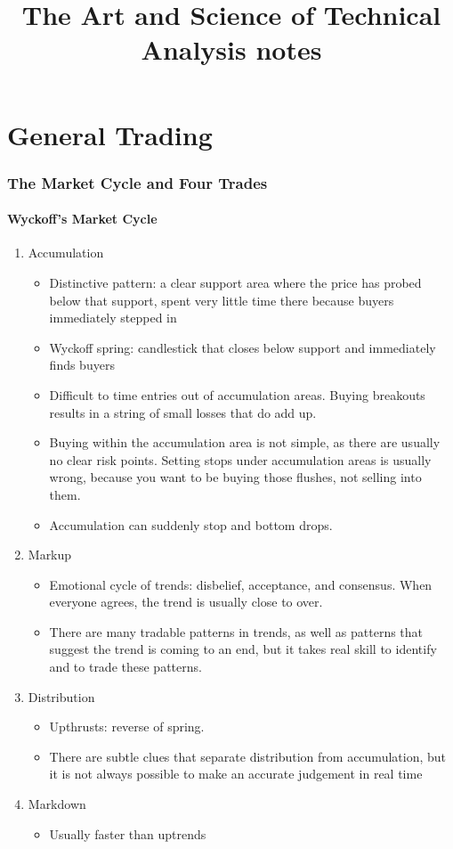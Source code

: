 \documentclass{../notes}
\title{The Art and Science of Technical Analysis notes}
\begin{document}
\maketitle

\part{General Trading}
\section{The Market Cycle and Four Trades}
\subsection{Wyckoff's Market Cycle}
\begin{enumerate}
  \item Accumulation
  \begin{itemize}
    \item Distinctive pattern: a clear support area where the price has probed below that support, spent very little time there because buyers immediately stepped in
    \item Wyckoff spring: candlestick that closes below support and immediately finds buyers
    \item Difficult to time entries out of accumulation areas. Buying breakouts results in a string of small losses that do add up.
    \item Buying within the accumulation area is not simple, as there are usually no clear risk points. Setting stops under accumulation areas is usually wrong, because you want to be buying those flushes, not selling into them.
    \item Accumulation can suddenly stop and bottom drops.
  \end{itemize}
  \item Markup
  \begin{itemize}
    \item Emotional cycle of trends: disbelief, acceptance, and consensus. When everyone agrees, the trend is usually close to over.
    \item There are many tradable patterns in trends, as well as patterns that suggest the trend is coming to an end, but it takes real skill to identify and to trade these patterns.
  \end{itemize}
  \item Distribution
  \begin{itemize}
    \item Upthrusts: reverse of spring.
    \item There are subtle clues that separate distribution from accumulation, but it is not always possible to make an accurate judgement in real time
  \end{itemize}
  \item Markdown
  \begin{itemize}
    \item Usually faster than uptrends
  \end{itemize}
\end{enumerate}
\end{document}
